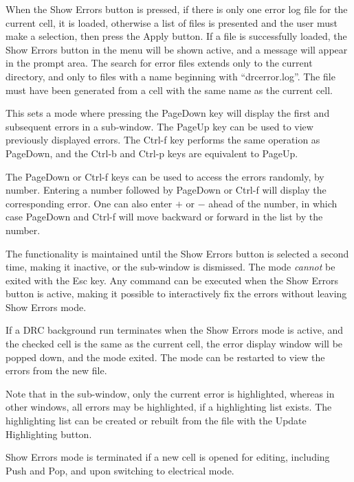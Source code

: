 When the {\cb Show Errors} button is pressed, if there is only one
error log file for the current cell, it is loaded, otherwise a list of
files is presented and the user must make a selection, then press the
{\cb Apply} button.  If a file is successfully loaded, the {\cb Show
Errors} button in the menu will be shown active, and a message will
appear in the prompt area.  The search for error files extends only to
the current directory, and only to files with a name beginning with
``{\vt drcerror.log}''.  The file must have been generated from a cell
with the same name as the current cell.

This sets a mode where pressing the {\kb PageDown} key will display
the first and subsequent errors in a sub-window.  The {\kb PageUp} key
can be used to view previously displayed errors.  The {\kb Ctrl-f} key
performs the same operation as {\kb PageDown}, and the {\kb Ctrl-b}
and {\kb Ctrl-p} keys are equivalent to {\kb PageUp}.

The {\kb PageDown} or {\kb Ctrl-f} keys can be used to access the
errors randomly, by number.  Entering a number followed by {\kb
PageDown} or {\kb Ctrl-f} will display the corresponding error.  One
can also enter {\kb $+$} or {\kb $-$} ahead of the number, in which
case {\kb PageDown} and {\kb Ctrl-f} will move backward or forward in
the list by the number.

The functionality is maintained until the {\cb Show Errors} button is
selected a second time, making it inactive, or the sub-window is
dismissed.  The mode {\it cannot} be exited with the {\kb Esc} key. 
Any command can be executed when the {\cb Show Errors} button is
active, making it possible to interactively fix the errors without
leaving {\cb Show Errors} mode. 

If a DRC background run terminates when the {\cb Show Errors} mode is
active, and the checked cell is the same as the current cell, the
error display window will be popped down, and the mode exited.  The
mode can be restarted to view the errors from the new file. 

Note that in the sub-window, only the current error is highlighted,
whereas in other windows, all errors may be highlighted, if a
highlighting list exists.  The highlighting list can be created or
rebuilt from the file with the {\cb Update Highlighting} button.

{\cb Show Errors} mode is terminated if a new cell is opened for
editing, including {\cb Push} and {\cb Pop}, and upon switching to
electrical mode.


